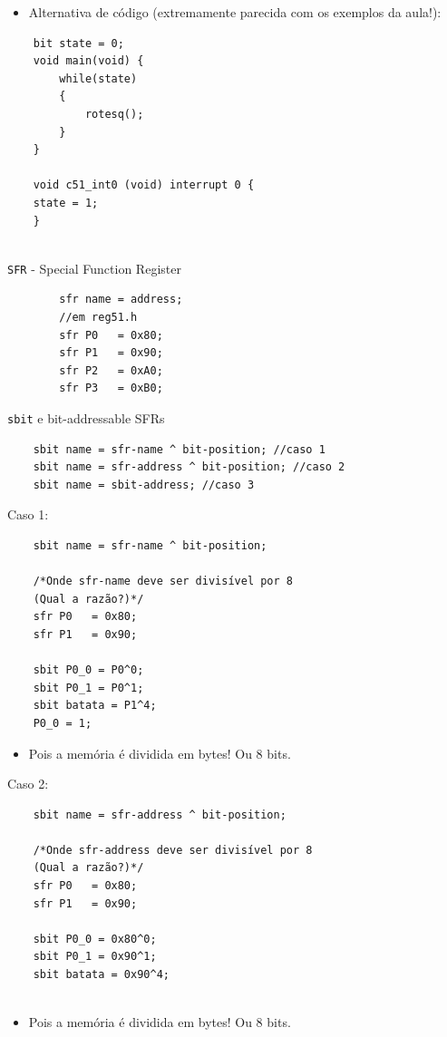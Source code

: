\documentclass[12pt,a4paper,aspectratio=169]{beamer}
\begin{document}
\begin{frame}[fragile]
	\begin{itemize}
		\item Alternativa de código (extremamente parecida com os exemplos da aula!):
	\end{itemize}
	\begin{verbatim}
	bit state = 0;
	void main(void) {
		while(state)
		{
			rotesq();
		}
	}
	
	void c51_int0 (void) interrupt 0 {
	state = 1;
	}
	
	\end{verbatim}
\end{frame}

\begin{frame}[fragile]
	\texttt{SFR} - Special Function Register
	\begin{verbatim}
		sfr name = address;
		//em reg51.h
		sfr P0   = 0x80;
		sfr P1   = 0x90;
		sfr P2   = 0xA0;
		sfr P3   = 0xB0;
	\end{verbatim}
\end{frame}

\begin{frame}[fragile]
	\texttt{sbit} e bit-addressable SFRs
	\begin{verbatim}
	sbit name = sfr-name ^ bit-position; //caso 1
	sbit name = sfr-address ^ bit-position; //caso 2
	sbit name = sbit-address; //caso 3
	\end{verbatim}
\end{frame}

\begin{frame}[fragile]
	Caso 1:
	
	\begin{verbatim}
	sbit name = sfr-name ^ bit-position;
	
	/*Onde sfr-name deve ser divisível por 8 
	(Qual a razão?)*/
	sfr P0   = 0x80;
	sfr P1   = 0x90;
	
	sbit P0_0 = P0^0;
	sbit P0_1 = P0^1;
	sbit batata = P1^4;
	P0_0 = 1;

	\end{verbatim}
	
	\begin{itemize}
		\item Pois a memória é dividida em bytes! Ou 8 bits.
	\end{itemize}
\end{frame}

\begin{frame}[fragile]
	Caso 2:
	
	\begin{verbatim}
	sbit name = sfr-address ^ bit-position;
	
	/*Onde sfr-address deve ser divisível por 8 
	(Qual a razão?)*/
	sfr P0   = 0x80;
	sfr P1   = 0x90;
	
	sbit P0_0 = 0x80^0;
	sbit P0_1 = 0x90^1;
	sbit batata = 0x90^4;
	
	\end{verbatim}
	
	\begin{itemize}
		\item Pois a memória é dividida em bytes! Ou 8 bits.
	\end{itemize}
\end{frame}
\end{document}
